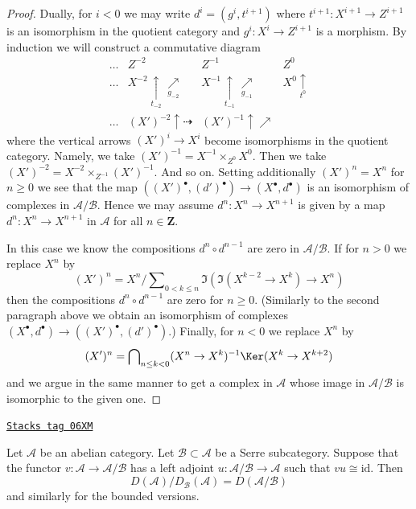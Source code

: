 \begin{proof}
\medskip\noindent
Dually, for $i < 0$ we may write $d^i = (g^i, t^{i + 1})$ where
$t^{i + 1} : X^{i + 1} \to Z^{i + 1}$ is an isomorphism in the
quotient category and $g^i : X^i \to Z^{i + 1}$ is a morphism.
By induction we will construct a commutative diagram
$$
\begin{array}{cccc}\ldots & Z^{-2} & Z^{-1} & Z^0 \\ \ldots & X^{-2} \underset{t_{-2}}{\uparrow}\underset{g_{-2}}{\nearrow} & X^{-1} \underset{t_{-1}}{\uparrow}\underset{g_{-1}}{\nearrow} & X^0 \underset{t^0}{\uparrow} \\ \ldots & (X')^{-2} \uparrow\dashrightarrow & (X')^{-1} \uparrow\nearrow & \end{array}
$$
where the vertical arrows $(X')^i \to X^i$ become isomorphisms
in the quotient category. Namely, we take
$(X')^{-1} = X^{-1} \times_{Z^0} X^0$. Then we take
$(X')^{-2} = X^{-2} \times_{Z^{-1}} (X')^{-1}$. And so on.
Setting additionally $(X')^n = X^n$ for $n \geq 0$ we see that the map
$((X')^\bullet, (d')^\bullet) \to (X^\bullet, d^\bullet)$
is an isomorphism of complexes in $\mathcal{A}/\mathcal{B}$.
Hence we may assume $d^n : X^n \to X^{n + 1}$ is given
by a map $d^n : X^n \to X^{n + 1}$ in $\mathcal{A}$
for all $n \in \mathbf{Z}$.

\medskip\noindent
In this case we know the compositions $d^n \circ d^{n - 1}$
are zero in $\mathcal{A}/\mathcal{B}$. If for $n > 0$ we replace
$X^n$ by
$$
(X')^n = X^n/\sum\nolimits_{0 < k \leq n} \Im(\Im(X^{k - 2} \to X^k) \to X^n)
$$
then the compositions $d^n \circ d^{n - 1}$ are zero for $n \geq 0$.
(Similarly to the second paragraph above we obtain an isomorphism of
complexes
$(X^\bullet, d^\bullet) \to ((X')^\bullet, (d')^\bullet)$.)
Finally, for $n < 0$ we replace $X^n$ by
$$
(X')^n = \bigcap\nolimits_{n \leq k < 0}
(X^n \to X^k)^{-1}\Ker(X^k \to X^{k + 2})
$$
and we argue in the same manner to get a complex in $\mathcal{A}$
whose image in $\mathcal{A}/\mathcal{B}$ is isomorphic to the given one.
\end{proof}

\begin{lemma}
\label{derived-lemma-quotient-by-serre-easy}
\href{https://stacks.math.columbia.edu/tag/06XM}{\texttt{Stacks tag 06XM}}

Let $\mathcal{A}$ be an abelian category.
Let $\mathcal{B} \subset \mathcal{A}$ be a Serre subcategory.
Suppose that the functor $v : \mathcal{A} \to \mathcal{A}/\mathcal{B}$
has a left adjoint $u : \mathcal{A}/\mathcal{B} \to \mathcal{A}$
such that $vu \cong \text{id}$. Then
$$
D(\mathcal{A})/D_\mathcal{B}(\mathcal{A}) = D(\mathcal{A}/\mathcal{B})
$$
and similarly for the bounded versions.
\end{lemma}

